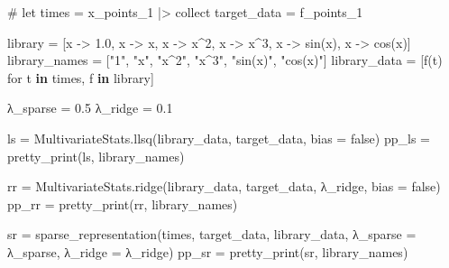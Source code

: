 \documentclass[
]{article}
\newenvironment{Shaded}{\begin{snugshade}}{\end{snugshade}}
\newcommand{\CommentTok}[1]{\textcolor[rgb]{0.37,0.37,0.37}{#1}}
\newcommand{\ConstantTok}[1]{\textcolor[rgb]{0.56,0.35,0.01}{#1}}
\newcommand{\FloatTok}[1]{\textcolor[rgb]{0.68,0.00,0.00}{#1}}
\newcommand{\FunctionTok}[1]{\textcolor[rgb]{0.28,0.35,0.67}{#1}}
\newcommand{\KeywordTok}[1]{\textcolor[rgb]{0.00,0.23,0.31}{\textbf{#1}}}
\newcommand{\NormalTok}[1]{\textcolor[rgb]{0.00,0.23,0.31}{#1}}
\newcommand{\OperatorTok}[1]{\textcolor[rgb]{0.37,0.37,0.37}{#1}}
\newcommand{\StringTok}[1]{\textcolor[rgb]{0.13,0.47,0.30}{#1}}
\begin{document}
\begin{Shaded}
\begin{Highlighting}[]
\CommentTok{\# let}
\NormalTok{times }\OperatorTok{=}\NormalTok{ x\_points\_1 }\OperatorTok{|\textgreater{}}\NormalTok{ collect}
\NormalTok{target\_data }\OperatorTok{=}\NormalTok{ f\_points\_1}

\NormalTok{library }\OperatorTok{=}\NormalTok{ [x }\OperatorTok{{-}\textgreater{}} \FloatTok{1.0}\NormalTok{, x }\OperatorTok{{-}\textgreater{}}\NormalTok{ x, x }\OperatorTok{{-}\textgreater{}}\NormalTok{ x}\OperatorTok{\^{}}\FloatTok{2}\NormalTok{, x }\OperatorTok{{-}\textgreater{}}\NormalTok{ x}\OperatorTok{\^{}}\FloatTok{3}\NormalTok{, x }\OperatorTok{{-}\textgreater{}} \FunctionTok{sin}\NormalTok{(x), x }\OperatorTok{{-}\textgreater{}} \FunctionTok{cos}\NormalTok{(x)]}
\NormalTok{library\_names }\OperatorTok{=}\NormalTok{ [}\StringTok{"1"}\NormalTok{, }\StringTok{"x"}\NormalTok{, }\StringTok{"x\^{}2"}\NormalTok{, }\StringTok{"x\^{}3"}\NormalTok{, }\StringTok{"sin(x)"}\NormalTok{, }\StringTok{"cos(x)"}\NormalTok{]}
\NormalTok{library\_data }\OperatorTok{=}\NormalTok{ [}\FunctionTok{f}\NormalTok{(t) for t }\KeywordTok{in}\NormalTok{ times, f }\KeywordTok{in}\NormalTok{ library]}

\NormalTok{λ\_sparse }\OperatorTok{=} \FloatTok{0.5}
\NormalTok{λ\_ridge }\OperatorTok{=} \FloatTok{0.1}

\NormalTok{ls }\OperatorTok{=}\NormalTok{ MultivariateStats.}\FunctionTok{llsq}\NormalTok{(library\_data, target\_data, bias }\OperatorTok{=} \ConstantTok{false}\NormalTok{)}
\NormalTok{pp\_ls }\OperatorTok{=} \FunctionTok{pretty\_print}\NormalTok{(ls, library\_names)}

\NormalTok{rr }\OperatorTok{=}\NormalTok{ MultivariateStats.}\FunctionTok{ridge}\NormalTok{(library\_data, target\_data, λ\_ridge, bias }\OperatorTok{=} \ConstantTok{false}\NormalTok{)}
\NormalTok{pp\_rr }\OperatorTok{=} \FunctionTok{pretty\_print}\NormalTok{(rr, library\_names)}

\NormalTok{sr }\OperatorTok{=} \FunctionTok{sparse\_representation}\NormalTok{(times, target\_data, library\_data, λ\_sparse }\OperatorTok{=}\NormalTok{ λ\_sparse, λ\_ridge }\OperatorTok{=}\NormalTok{ λ\_ridge)}
\NormalTok{pp\_sr }\OperatorTok{=} \FunctionTok{pretty\_print}\NormalTok{(sr, library\_names)}


\end{Highlighting}
\end{Shaded}
\end{document}
